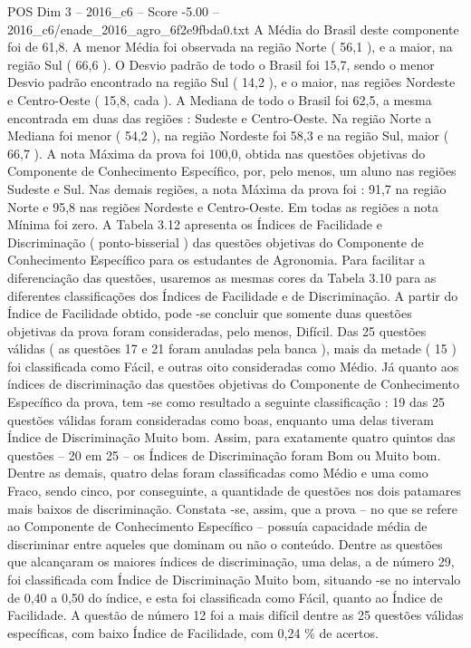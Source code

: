 \begin{textsample}{POS Dim 3 – 2016\_c6 – Score -5.00 – 2016\_c6/enade\_2016\_agro\_6f2e9fbda0.txt}
A Média do Brasil deste componente foi de 61,8.
A menor Média foi observada na região Norte ( 56,1 ), e a maior, na região Sul ( 66,6 ).
O Desvio padrão de todo o Brasil foi 15,7, sendo o menor Desvio padrão encontrado na região Sul ( 14,2 ), e o maior, nas regiões Nordeste e Centro-Oeste ( 15,8, cada ).
A Mediana de todo o Brasil foi 62,5, a mesma encontrada em duas das regiões : Sudeste e Centro-Oeste.
Na região Norte a Mediana foi menor ( 54,2 ), na região Nordeste foi 58,3 e na região Sul, maior ( 66,7 ).
A nota Máxima da prova foi 100,0, obtida nas questões objetivas do Componente de Conhecimento Específico, por, pelo menos, um aluno nas regiões Sudeste e Sul.
Nas demais regiões, a nota Máxima da prova foi : 91,7 na região Norte e 95,8 nas regiões Nordeste e Centro-Oeste.
Em todas as regiões a nota Mínima foi zero.
A Tabela 3.12 apresenta os Índices de Facilidade e Discriminação ( ponto-bisserial ) das questões objetivas do Componente de Conhecimento Específico para os estudantes de Agronomia.
Para facilitar a diferenciação das questões, usaremos as mesmas cores da Tabela 3.10 para as diferentes classificações dos Índices de Facilidade e de Discriminação.
A partir do Índice de Facilidade obtido, pode -se concluir que somente duas questões objetivas da prova foram consideradas, pelo menos, Difícil.
Das 25 questões válidas ( as questões 17 e 21 foram anuladas pela banca ), mais da metade ( 15 ) foi classificada como Fácil, e outras oito consideradas como Médio.
Já quanto aos índices de discriminação das questões objetivas do Componente de Conhecimento Específico da prova, tem -se como resultado a seguinte classificação : 19 das 25 questões válidas foram consideradas como boas, enquanto uma delas tiveram Índice de Discriminação Muito bom.
Assim, para exatamente quatro quintos das questões – 20 em 25 – os Índices de Discriminação foram Bom ou Muito bom.
Dentre as demais, quatro delas foram classificadas como Médio e uma como Fraco, sendo cinco, por conseguinte, a quantidade de questões nos dois patamares mais baixos de discriminação.
Constata -se, assim, que a prova – no que se refere ao Componente de Conhecimento Específico – possuía capacidade média de discriminar entre aqueles que dominam ou não o conteúdo.
Dentre as questões que alcançaram os maiores índices de discriminação, uma delas, a de número 29, foi classificada com Índice de Discriminação Muito bom, situando -se no intervalo de 0,40 a 0,50 do índice, e esta foi classificada como Fácil, quanto ao Índice de Facilidade.
A questão de número 12 foi a mais difícil dentre as 25 questões válidas específicas, com baixo Índice de Facilidade, com 0,24 \% de acertos.

\end{textsample}
